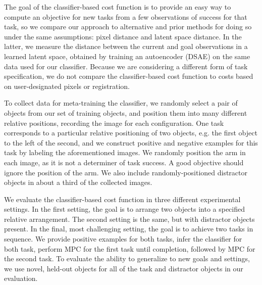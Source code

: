 
The goal of the classifier-based cost function is to provide an easy way to compute an objective for new tasks from a few observations of success for that task, so we compare our approach to alternative and prior methods for doing so under the same assumptions: pixel distance and latent space distance. In the latter, we measure the distance between the current and goal observations in a learned latent space, obtained by training an autoencoder (DSAE) \cite{dsae} on the same data used for our classifier. Because we are considering a different form of task specification, we do not compare the classifier-based cost function to costs based on user-designated pixels or registration.


To collect data for meta-training the classifier, we randomly select a pair of objects from our set of training objects, and position them into many different relative positions, recording the image for each configuration. One task corresponds to a particular relative positioning of two objects, e.g. the first object to the left of the second, and we construct positive and negative examples for this task by labeling the aforementioned images. We randomly position the arm in each image, as it is not a determiner of task success. A good objective should ignore the position of the arm. We also include randomly-positioned distractor objects in about a third of the collected images.

We evaluate the classifier-based cost function in three different experimental settings. In the first setting, the goal is to arrange two objects into a specified relative arrangement. The second setting is the same, but with distractor objects present. In the final, most challenging setting, the goal is to achieve two tasks in sequence. We provide positive examples for both tasks, infer the classifier for both task, perform MPC for the first task until completion, followed by MPC for the second task. To evaluate the ability to generalize to new goals and settings, we use novel, held-out objects for all of the task and distractor objects in our evaluation. 

